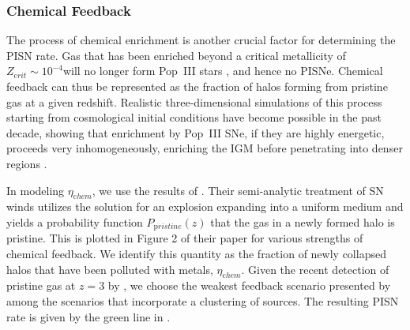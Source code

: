 \documentclass[../thesis.tex]{subfiles}
\begin{document}
\subsubsection{Chemical Feedback}
The process of chemical enrichment is another crucial factor for
determining the PISN rate.  Gas that has been enriched beyond a
critical metallicity of $Z_{\mathrm crit} \sim 10^{-4}$\zsun will
no longer form Pop~III stars \citep{BrommKudritzkiLoeb2001,
  Schneideretal2002, BrommLoeb2003apj}, and hence no PISNe.  Chemical
feedback can thus be represented as the fraction of halos forming from
pristine gas at a given redshift.  Realistic three-dimensional
simulations of this process starting from cosmological initial
conditions have become possible in the past decade, showing that
enrichment by Pop~III SNe, if they are highly energetic, proceeds very
inhomogeneously, enriching the IGM before penetrating into denser
regions \citep{Scannapiecoetal2005, Greifetal2007,
  TornatoreFerraraSchneider2007,WiseAbel2008, Maioetal2010}.

In modeling $\eta_{\mathrm chem}$, we use the results of
\citet{FurlanettoLoeb2005}.  Their semi-analytic treatment of SN winds
utilizes the \citet{Sedov1959} solution for an explosion expanding
into a uniform medium and yields a probability function $P_{\mathrm
  pristine}(z)$ that the gas in a newly formed halo is pristine.  This
is plotted in Figure 2 of their paper for various strengths of
chemical feedback.  We identify this quantity as the fraction of newly
collapsed halos that have been polluted with metals, $\eta_{\mathrm
  chem}$.  Given the recent detection of pristine gas at $z = 3$ by
\citet{FumagalliOMearaProchaska2011}, we choose the weakest feedback
scenario presented by \citet{FurlanettoLoeb2005} among the scenarios
that incorporate a clustering of sources. The resulting PISN rate is
given by the green line in .
\end{document}
